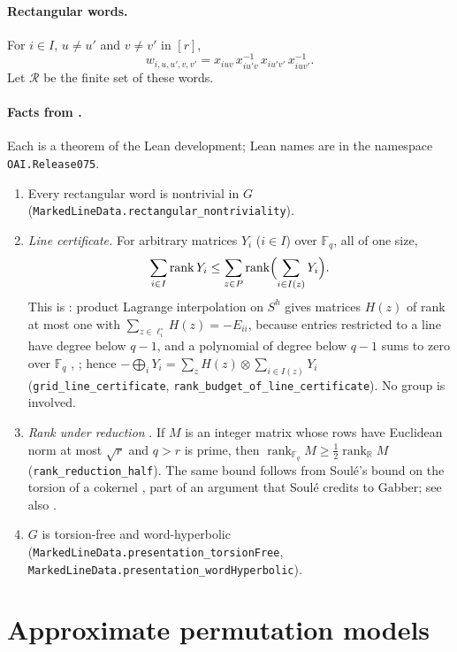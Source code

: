 \documentclass[11pt]{article}
\theoremstyle{definition}
\theoremstyle{remark}
\numberwithin{equation}{section}
\DeclareMathOperator{\rank}{rank}
\newcommand{\F}{\mathbb F}
\newcommand{\R}{\mathbb R}
\newcommand{\cR}{\mathcal R}
\newcommand{\lean}[1]{\nolinkurl{#1}}
\begin{document}
\paragraph{Rectangular words.} For $i\in I$, $u\ne u'$ and $v\ne v'$ in $[r]$,
\[
 w_{i,u,u',v,v'}=x_{iuv}\,x_{iu'v}^{-1}\,x_{iu'v'}\,x_{iuv'}^{-1}.
\]
Let $\cR$ be the finite set of these words.

\paragraph{Facts from \cite{OAI252}.} Each is a theorem of the Lean development; Lean names are in the namespace \lean{OAI.Release075}.
\begin{enumerate}[label=(F\arabic*),leftmargin=*]
\item\label{F:rect} Every rectangular word is nontrivial in $G$ \cite[(2.6)]{OAI252} (\lean{MarkedLineData.rectangular_nontriviality}).
\item\label{F:cert} \emph{Line certificate.} For arbitrary matrices $Y_i$ ($i\in I$) over $\F_q$, all of one size,
\[
 \sum_{i\in I}\rank Y_i\le\sum_{z\in P}\rank\Bigl(\sum_{i\in I(z)}Y_i\Bigr).
\]
This is \cite[(2.13)--(2.14)]{OAI252}: product Lagrange interpolation on $S^h$ \cite[Lemma~1.3, Theorem~2.3]{Schauz2008} gives matrices $H(z)$ of rank at most one with $\sum_{z\in\ell_i^\circ}H(z)=-E_{ii}$, because entries restricted to a line have degree below $q-1$, and a polynomial of degree below $q-1$ sums to zero over $\F_q$ \cite[Chapter~I, \S2.1, Lemma]{Serre1973}, \cite[Theorem~3.3(i)]{Schauz2008}; hence $-\bigoplus_iY_i=\sum_zH(z)\otimes\sum_{i\in I(z)}Y_i$ (\lean{grid_line_certificate}, \lean{rank_budget_of_line_certificate}). No group is involved.
\item\label{F:red} \emph{Rank under reduction} \cite[Lemma~2.4]{OAI252}. If $M$ is an integer matrix whose rows have Euclidean norm at most $\sqrt r$ and $q>r$ is prime, then $\rank_{\F_q}M\ge\frac12\rank_\R M$ (\lean{rank_reduction_half}). The same bound follows from Soul\'e's bound on the torsion of a cokernel \cite[Lemma~1]{Soule1999}, part of an argument that Soul\'e credits to Gabber; see also \cite[Lemma~3.1]{Sauer2016}.
\item\label{F:geo} $G$ is torsion-free and word-hyperbolic \cite[Theorem~2.1, Lemma~2.3]{OAI252} (\lean{MarkedLineData.presentation_torsionFree}, \lean{MarkedLineData.presentation_wordHyperbolic}).
\end{enumerate}

\section{Approximate permutation models}\label{sec:transfer}
\end{document}
